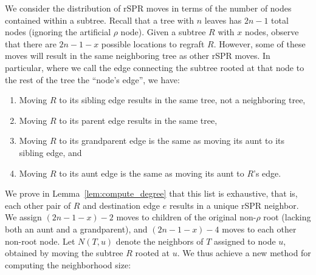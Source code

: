\documentclass[]{elsarticle}
\begin{document}
We consider the distribution of rSPR moves in terms of the number of nodes contained within a subtree.
Recall that a tree with $n$ leaves has $2n-1$ total nodes (ignoring the artificial $\rho$ node).
Given a subtree $R$ with $x$ nodes, observe that there are $2n-1 - x$ possible locations to regraft $R$.
However, some of these moves will result in the same neighboring tree as other rSPR moves.
In particular, where we call the edge connecting the subtree rooted at that node to the rest of the tree the ``node's edge'', we have:
\begin{enumerate}
\item Moving $R$ to its sibling edge results in the same tree, not a neighboring tree,
\item Moving $R$ to its parent edge results in the same tree,
\item Moving $R$ to its grandparent edge is the same as moving its aunt to its sibling edge, and
\item Moving $R$ to its aunt edge is the same as moving its aunt to $R$'s edge.
\end{enumerate}
We prove in Lemma~\ref{lem:compute_degree} that this list is exhaustive, that is, each other pair of $R$ and destination edge $e$ results in a unique rSPR neighbor.
We assign $(2n-1-x)-2$ moves to children of the original non-$\rho$ root (lacking both an aunt and a grandparent), and $(2n-1-x)-4$ moves to each other non-root node.
Let $N(T,u)$ denote the neighbors of $T$ assigned to node $u$, obtained by moving the subtree $R$ rooted at $u$.
We thus achieve a new method for computing the neighborhood size:
\end{document}

